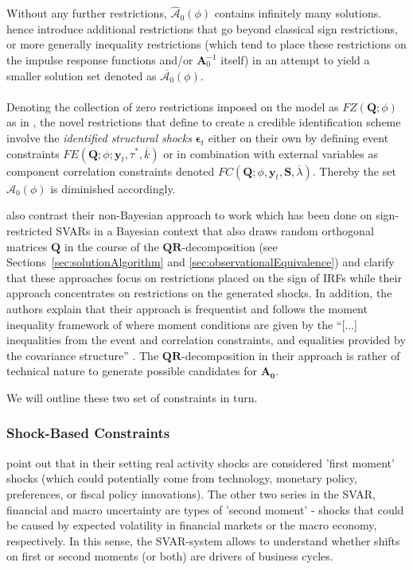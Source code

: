 \documentclass[a4paper,11pt,listof=nochaptergap,oneside,pointednumbers,bibtotoc,bigheadings,liststotoc]{scrbook}
\theoremstyle{mysatz}
\theoremstyle{mydefinition}
\theoremstyle{mytheorem}
\theoremstyle{mybemerkung}
\let\oldhat\hat
\newcommand{\vect}[1]{\boldsymbol{\mathbf{#1}}}
\newcommand{\hatt}[1]{\oldhat{\boldsymbol{\mathbf{#1}}}}
\begin{document}
Without any further restrictions, $\hatt{\mathcal{A}}_0(\phi)$ contains infinitely many solutions. \citet{ludvigsonetal:18} hence introduce additional restrictions that go beyond classical sign restrictions, or more generally inequality restrictions (which tend to place these restrictions on the impulse response functions and/or $\vect{A}_0^{-1}$ itself) in an attempt to yield a smaller solution set denoted as $\overline{\mathcal{A}_0}(\phi)$.\\
\\
Denoting the collection of zero restrictions imposed on the model as $FZ(\vect{Q}; \phi)$ as in \citet{rubioetal:10}, the novel restrictions that \citet{ludvigsonetal:18} define to create a credible identification scheme involve the \textit{identified structural shocks} $\vect{\epsilon}_t$ either on their own by defining event constraints $FE(\vect{Q}; \phi; \vect{y}_t, \tau^*, \overline{k})$ or in combination with external variables as component correlation constraints denoted $FC(\vect{Q}; \phi, \vect{y}_t, \vect{S}, \overline{\lambda})$. Thereby the set $\hatt{\mathcal{A}}_0(\phi)$ is diminished accordingly.

\citet{ludvigsonetal:18} also contrast their non-Bayesian approach to work which has been done on sign-restricted SVARs in a Bayesian context that also draws random orthogonal matrices $\vect{Q}$ in the course of the $\vect{QR}$-decomposition (see Sections~\ref{sec:solutionAlgorithm} and \ref{sec:observationalEquivalence}) and clarify that these approaches focus on restrictions placed on the sign of IRFs while their approach concentrates on restrictions on the generated shocks. In addition, the authors explain that their approach is frequentist and follows the moment inequality framework of \citet{andrewsandsoares:10} where moment conditions are given by the ``[...] inequalities from the event and correlation constraints, and equalities provided by the covariance structure'' \citet[p. 11]{ludvigsonetal:18}. The $\vect{QR}$-decomposition in their approach is rather of technical nature to generate possible candidates for $\vect{A_0}$.

We will outline these two set of constraints in turn.

\subsubsection{Shock-Based Constraints}
\citet{ludvigsonetal:18} point out that in their setting real activity shocks are considered 'first moment' shocks (which could potentially come from technology, monetary policy, preferences, or fiscal policy innovations). The other two series in the SVAR, financial and macro uncertainty are types of 'second moment' - shocks that could be caused by expected volatility in financial markets or the macro economy, respectively. In this sense, the SVAR-system allows to understand whether shifts on first or second moments (or both) are drivers of business cycles.
\end{document}

